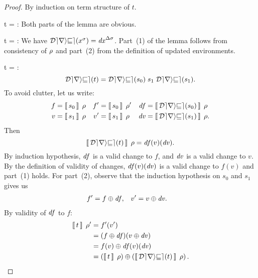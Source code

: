 \begin{proof}
By induction on term structure of $t$.

\Case t = :
Both parts of the lemma are obvious.

\Case t = :
We have $\Derive{x^\Gs}=\D x^{\GD\Gs}$. Part~(1) of the lemma
follows from consistency of $\rho$ and part~(2) from the
definition of updated environments.

\Case t = :
\[
\Derive{t}=\App{\App{\Derive{s_0}}{s_1}}{\Derive{s_1}}.
\]
To avoid clutter, let us write:
\begin{align*}
  f  & = \mean[\Gr]{s_0} &
  f' & = \mean[\Gr']{s_0} &
\D f & = \mean[\Gr]{\Derive{s_0}}\\
  v  & = \mean[\Gr]{s_1} &
  v' & = \mean[\Gr]{s_1} &
\D v & = \mean[\Gr]{\Derive{s_1}}.
\end{align*}
Then
\[
\mean[\Gr]{\Derive{t}} = \D f(v)(\D v).
\]
By induction hypothesis, $\mathit{df}$ is a valid change to $f$, and $\mathit{dv}$ is a valid change to $v$. By the definition of validity of
changes, $\mathit{df}(v)(\mathit{dv})$ is a valid change to $f(v)$ and part~(1)
holds. For part~(2), observe that the induction hypothesis on
$s_0$ and $s_1$ gives us
\begin{align*}
f' &= \Apply{\D f}{f},&
v' &= \Apply{\D v}{v}.
\end{align*}
By validity of $\mathit{df}$ to $f$:
\begin{align*}
\mean[\Gr']{t}
& = f'(v') \\
& = (\Apply{\D f}f)(\Apply{\D v}{v}) \\
& = \Apply{\D f(v)(\D v)}{f(v)} \\
& = \Apply{\mean*[\Gr]{\Derive t}}{\mean*[\Gr]t}.
\end{align*}


\end{proof}
